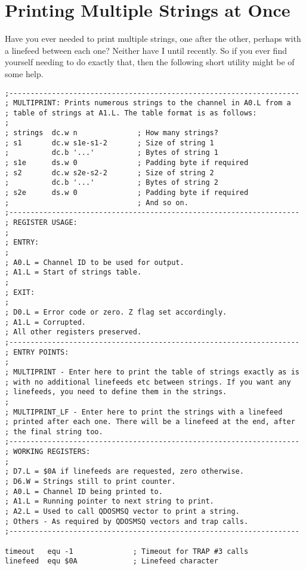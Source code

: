 \chapter{Printing Multiple Strings at Once}
Have you ever needed to print multiple strings, one after the other, perhaps with a linefeed between each one? Neither have I until recently. So if you ever find yourself needing to do exactly that, then the following short utility might be of some help.

\begin{lstlisting}[firstnumber=1,caption={Multiprint Utility}]
;--------------------------------------------------------------------
; MULTIPRINT: Prints numerous strings to the channel in A0.L from a
; table of strings at A1.L. The table format is as follows:
;
; strings  dc.w n              ; How many strings?
; s1       dc.w s1e-s1-2       ; Size of string 1
;          dc.b '...'          ; Bytes of string 1
; s1e      ds.w 0              ; Padding byte if required
; s2       dc.w s2e-s2-2       ; Size of string 2
;          dc.b '...'          ; Bytes of string 2
; s2e      ds.w 0              ; Padding byte if required
;                              ; And so on.
;--------------------------------------------------------------------
; REGISTER USAGE:
;
; ENTRY:
;
; A0.L = Channel ID to be used for output.
; A1.L = Start of strings table.
;
; EXIT:
;
; D0.L = Error code or zero. Z flag set accordingly.
; A1.L = Corrupted.
; All other registers preserved.
;--------------------------------------------------------------------
; ENTRY POINTS:
;
; MULTIPRINT - Enter here to print the table of strings exactly as is
; with no additional linefeeds etc between strings. If you want any
; linefeeds, you need to define them in the strings.
;
; MULTIPRINT_LF - Enter here to print the strings with a linefeed 
; printed after each one. There will be a linefeed at the end, after
; the final string too.
;--------------------------------------------------------------------
; WORKING REGISTERS:
;
; D7.L = $0A if linefeeds are requested, zero otherwise.
; D6.W = Strings still to print counter.
; A0.L = Channel ID being printed to.
; A1.L = Running pointer to next string to print.
; A2.L = Used to call QDOSMSQ vector to print a string.
; Others - As required by QDOSMSQ vectors and trap calls.
;--------------------------------------------------------------------

timeout   equ -1              ; Timeout for TRAP #3 calls
linefeed  equ $0A             ; Linefeed character


\end{lstlisting}
